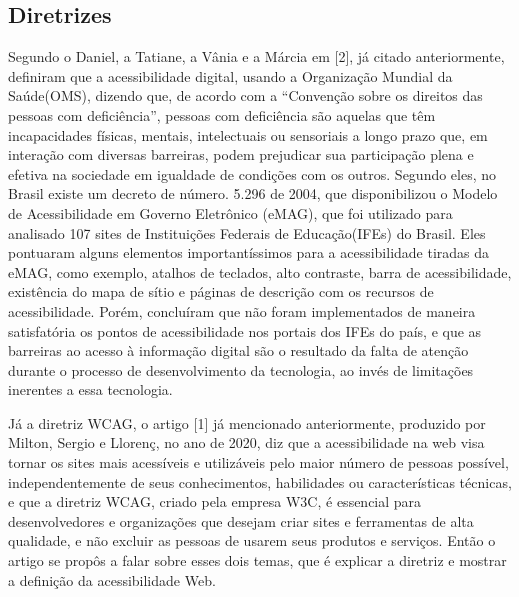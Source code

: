\documentclass[a4paper]{article}
\begin{document}
\begin{titlepage}
\subsection{Diretrizes}
Segundo o Daniel, a Tatiane, a Vânia e a Márcia em [2], já citado anteriormente, definiram que a acessibilidade digital, usando a Organização Mundial da Saúde(OMS), dizendo que, de acordo com a “Convenção sobre os direitos das pessoas com deficiência”, pessoas com deficiência são aquelas que têm incapacidades físicas, mentais, intelectuais ou sensoriais a longo prazo que, em interação com diversas barreiras, podem prejudicar sua participação plena e efetiva na sociedade em igualdade de condições com os outros. Segundo eles, no Brasil existe um decreto de número. 5.296 de 2004, que disponibilizou o Modelo de Acessibilidade em Governo Eletrônico (eMAG), que foi utilizado para analisado 107 sites de Instituições Federais de Educação(IFEs) do Brasil. Eles pontuaram alguns elementos importantíssimos para a acessibilidade tiradas da eMAG, como exemplo, atalhos de teclados, alto contraste, barra de acessibilidade, existência do mapa de sítio e páginas de descrição com os recursos de acessibilidade. Porém, concluíram que não foram implementados de maneira satisfatória os pontos de acessibilidade nos portais dos IFEs do país, e que as barreiras ao acesso à informação digital são o resultado da falta de atenção durante o processo de desenvolvimento da tecnologia, ao invés de limitações inerentes a essa tecnologia.

Já a diretriz WCAG, o artigo [1] já mencionado anteriormente, produzido por Milton, Sergio e Llorenç, no ano de 2020, diz que a acessibilidade na web visa tornar os sites mais acessíveis e utilizáveis pelo maior número de pessoas possível, independentemente de seus conhecimentos, habilidades ou características técnicas, e que a diretriz WCAG, criado pela empresa W3C, é essencial para desenvolvedores e organizações que desejam criar sites e ferramentas de alta qualidade, e não excluir as pessoas de usarem seus produtos e serviços. Então o artigo se propôs a falar sobre esses dois temas, que é explicar a diretriz e mostrar a definição da acessibilidade Web.


\end{titlepage}
\end{document}
